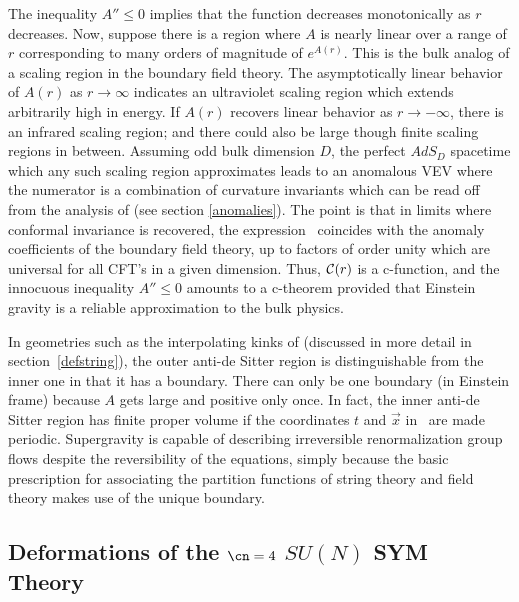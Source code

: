 The inequality $A'' \leq 0$ implies that the function
 decreases monotonically as $r$ decreases.  Now, suppose there is a region
where $A$ is nearly linear over a range of $r$ corresponding to many orders
of magnitude of $e^{A(r)}$.  This is the bulk analog of a scaling region in
the boundary field theory.  The asymptotically linear behavior of $A(r)$ as
$r\to\infty$ indicates an ultraviolet scaling region which extends
arbitrarily high in energy.  If $A(r)$ recovers linear behavior as $r \to
-\infty$, there is an infrared scaling region; and there could also be
large though finite scaling regions in between.  Assuming odd bulk
dimension $D$, the perfect $AdS_D$ spacetime which any such scaling region
approximates leads to an anomalous VEV
 where the numerator is a combination of curvature invariants which can be
read off from the analysis of \cite{Henningson:1998gx} (see section
\ref{anomalies}).  The point is that
in limits where conformal invariance is recovered, the expression
\CFunction\ coincides with the anomaly coefficients of the boundary field
theory, up to factors of order unity which are universal for all CFT's in a
given dimension.  Thus, ${\cal C}(r)$ is a c-function, and the innocuous
inequality $A'' \leq 0$ amounts to a c-theorem provided that Einstein
gravity is a reliable approximation to the bulk physics.

In geometries such as the interpolating kinks of
\cite{Girardello:1998pd,Distler:1998gb,Freedman:1999gp} (discussed in more
detail in section~\ref{defstring}), the outer anti-de Sitter region is
distinguishable from the inner one in that it has a boundary.  There can
only be one boundary (in Einstein frame) because $A$ gets large and
positive only once.  In fact, the inner anti-de Sitter region has finite
proper volume if the coordinates $t$ and $\vec{x}$ in \DefMet\ are made
periodic.  Supergravity is capable of describing irreversible
renormalization group flows despite the reversibility of the equations,
simply because the basic prescription for associating the partition
functions of string theory and field theory makes use of the unique
boundary.





 \subsection{Deformations of the $\cn=4$ $SU(N)$ SYM Theory}
 \label{deffield}

